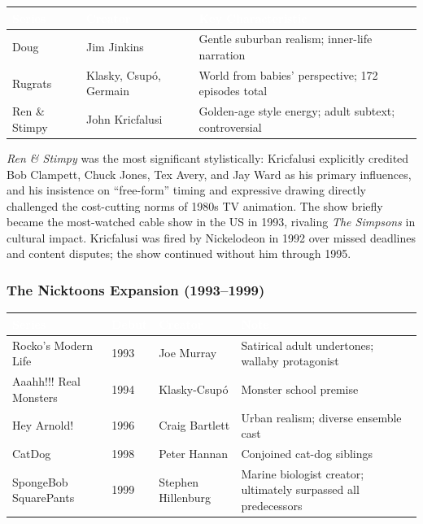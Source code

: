 \documentclass[11pt,letterpaper]{article}
\newcommand{\tableheader}[1]{\textbf{\sffamily\textcolor{white}{#1}}}
\begin{document}
\begin{center}
\begin{tabularx}{\textwidth}{L{2.5cm}L{2.5cm}X}
\toprule
{}
\tableheader{Series} & \tableheader{Creator} & \tableheader{Key Characteristic} \\
\midrule
Doug & Jim Jinkins & Gentle suburban realism; inner-life narration \\
Rugrats & Klasky, Csup\'o, Germain & World from babies' perspective; 172 episodes total \\
Ren \& Stimpy & John Kricfalusi & Golden-age style energy; adult subtext; controversial \\
\bottomrule
\end{tabularx}
\end{center}

\textit{Ren \& Stimpy} was the most significant stylistically: Kricfalusi explicitly credited Bob Clampett, Chuck Jones, Tex Avery, and Jay Ward as his primary influences, and his insistence on ``free-form'' timing and expressive drawing directly challenged the cost-cutting norms of 1980s TV animation. The show briefly became the most-watched cable show in the US in 1993, rivaling \textit{The Simpsons} in cultural impact. Kricfalusi was fired by Nickelodeon in 1992 over missed deadlines and content disputes; the show continued without him through 1995.

\subsubsection{The Nicktoons Expansion (1993--1999)}

\begin{center}
\begin{tabularx}{\textwidth}{L{3cm}C{1.2cm}L{2.5cm}X}
\toprule
{}
\tableheader{Series} & \tableheader{Debut} & \tableheader{Creator} & \tableheader{Note} \\
\midrule
Rocko's Modern Life & 1993 & Joe Murray & Satirical adult undertones; wallaby protagonist \\
Aaahh!!! Real Monsters & 1994 & Klasky-Csup\'o & Monster school premise \\
Hey Arnold! & 1996 & Craig Bartlett & Urban realism; diverse ensemble cast \\
CatDog & 1998 & Peter Hannan & Conjoined cat-dog siblings \\
SpongeBob SquarePants & 1999 & Stephen Hillenburg & Marine biologist creator; ultimately surpassed all predecessors \\
\bottomrule
\end{tabularx}
\end{center}
\end{document}
